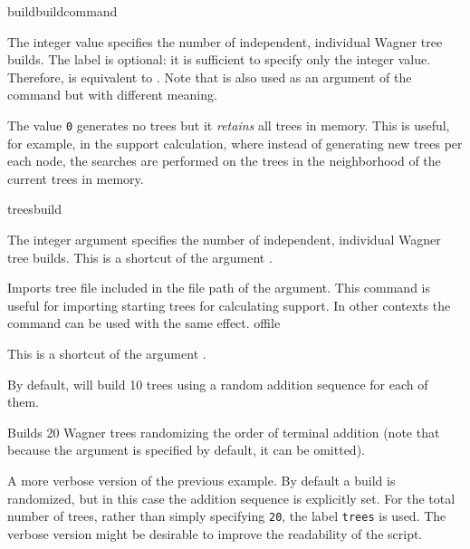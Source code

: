 \begin{command}{build}{buildcommand}
\begin{arguments}
            {The integer value specifies the number of independent, individual
            Wagner tree builds. The label  is optional: it is
            sufficient to specify only the integer value. Therefore,  is
            equivalent to .  Note that   is
            also used as an argument of the command 
            but with different meaning.
            
            The value \texttt{0} generates no trees but it \emph{retains} all trees in memory.
            This is useful, for example, in the  support calculation,
            where instead of generating new trees per each node, the searches are
            performed on the trees in the neighborhood of the current trees in memory.}
            {treesbuild}

            {The integer argument specifies the number of independent, individual
            Wagner tree builds. This is a shortcut of the argument .}
            {}

            {Imports tree file included in the file path of the argument. This command is
            useful for importing starting trees for calculating  support.
            In other contexts the command  can be used with the same effect.}
            {offile}

            {This is a shortcut of the argument .}
            {}

   \end{arguments}
      
       {By default, \poy will build 10 trees using a random addition sequence for
       each of them.}

	\begin{poyexamples}
            {Builds 20 Wagner trees randomizing the order of terminal
            addition (note that because the argument  is specified by default, 
            it can be omitted).}

            {A more verbose version of the previous example. By default a build
            is randomized, but in this case the addition sequence is explicitly
            set. For the total number of trees, rather than simply specifying \texttt{20},
            the label \texttt{trees} is used. The verbose version might be desirable
            to improve the readability of the script.}


\end{poyexamples}
\end{command}
